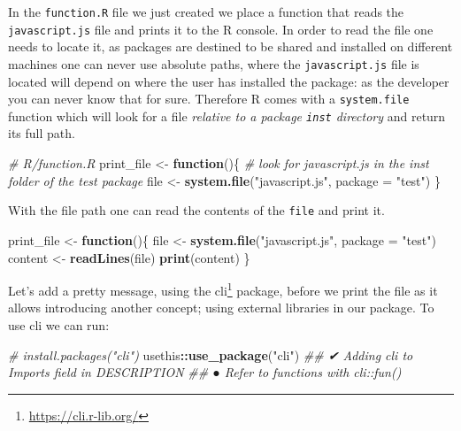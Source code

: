 \documentclass[
]{krantz}
\makeatletter
\newenvironment{Shaded}{\begin{snugshade}}{\end{snugshade}}
\newcommand{\CommentTok}[1]{\textcolor[rgb]{0.37,0.37,0.37}{\textit{#1}}}
\newcommand{\ControlFlowTok}[1]{\textcolor[rgb]{0.27,0.27,0.27}{\textbf{#1}}}
\newcommand{\DataTypeTok}[1]{\textcolor[rgb]{0.27,0.27,0.27}{#1}}
\newcommand{\KeywordTok}[1]{\textcolor[rgb]{0.27,0.27,0.27}{\textbf{#1}}}
\newcommand{\NormalTok}[1]{#1}
\newcommand{\OperatorTok}[1]{\textcolor[rgb]{0.43,0.43,0.43}{\textbf{#1}}}
\newcommand{\StringTok}[1]{\textcolor[rgb]{0.5,0.5,0.5}{#1}}
\renewcommand{\href}[2]{#2\footnote{\url{#1}}}
\newenvironment{kframe}{%
\medskip{}
\setlength{\fboxsep}{.8em}
 \def\at@end@of@kframe{}%
 \ifinner\ifhmode%
  \def\at@end@of@kframe{\end{minipage}}%
  \begin{minipage}{\columnwidth}%
 \fi\fi%
 \def\FrameCommand##1{\hskip\@totalleftmargin \hskip-\fboxsep
 \colorbox{shadecolor}{##1}\hskip-\fboxsep
     \hskip-\linewidth \hskip-\@totalleftmargin \hskip\columnwidth}%
 \MakeFramed {\advance\hsize-\width
   \@totalleftmargin\z@ \linewidth\hsize
   \@setminipage}}%
 {\par\unskip\endMakeFramed%
 \at@end@of@kframe}
\renewenvironment{Shaded}{\begin{kframe}}{\end{kframe}}
\makeatother
\begin{document}
In the \texttt{function.R} file we just created we place a function that reads the \texttt{javascript.js} file and prints it to the R console. In order to read the file one needs to locate it, as packages are destined to be shared and installed on different machines one can never use absolute paths, where the \texttt{javascript.js} file is located will depend on where the user has installed the package: as the developer you can never know that for sure. Therefore R comes with a \texttt{system.file} function which will look for a file \emph{relative to a package \texttt{inst} directory} and return its full path.

\begin{Shaded}
\begin{Highlighting}[]
\CommentTok{\# R/function.R}
\NormalTok{print\_file <{-}}\StringTok{ }\ControlFlowTok{function}\NormalTok{()\{}
  \CommentTok{\# look for javascript.js in the inst folder of the test package}
\NormalTok{  file <{-}}\StringTok{ }\KeywordTok{system.file}\NormalTok{(}\StringTok{"javascript.js"}\NormalTok{, }\DataTypeTok{package =} \StringTok{"test"}\NormalTok{)}
\NormalTok{\}}
\end{Highlighting}
\end{Shaded}

With the file path one can read the contents of the \texttt{file} and print it.

\begin{Shaded}
\begin{Highlighting}[]
\NormalTok{print\_file <{-}}\StringTok{ }\ControlFlowTok{function}\NormalTok{()\{}
\NormalTok{  file <{-}}\StringTok{ }\KeywordTok{system.file}\NormalTok{(}\StringTok{"javascript.js"}\NormalTok{, }\DataTypeTok{package =} \StringTok{"test"}\NormalTok{)}
\NormalTok{  content <{-}}\StringTok{ }\KeywordTok{readLines}\NormalTok{(file)}
  \KeywordTok{print}\NormalTok{(content)}
\NormalTok{\}}
\end{Highlighting}
\end{Shaded}

Let's add a pretty message, using the \href{https://cli.r-lib.org/}{cli} \citep{R-cli} package, before we print the file as it allows introducing another concept; using external libraries in our package. To use cli we can run:

\begin{Shaded}
\begin{Highlighting}[]
\CommentTok{\# install.packages("cli")}
\NormalTok{usethis}\OperatorTok{::}\KeywordTok{use\_package}\NormalTok{(}\StringTok{"cli"}\NormalTok{)}
\CommentTok{\#\# ✔ Adding \textquotesingle{}cli\textquotesingle{} to Imports field in DESCRIPTION}
\CommentTok{\#\# ● Refer to functions with \textasciigrave{}cli::fun()\textasciigrave{}}
\end{Highlighting}
\end{Shaded}
\end{document}
